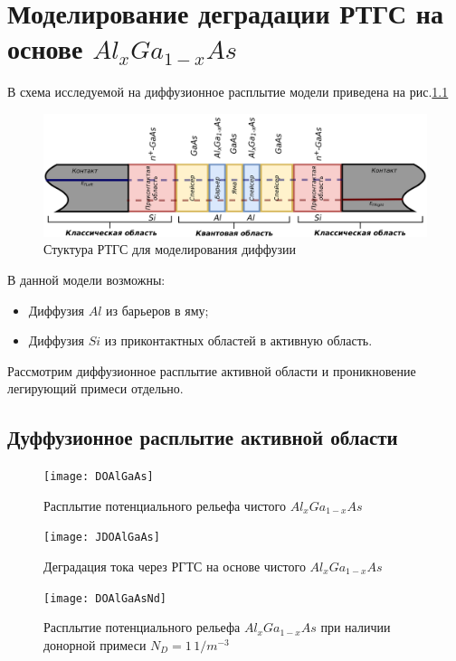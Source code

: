 \chapter{Моделирование деградации РТГС на основе $Al_{x}Ga_{1−x}As$}
В схема исследуемой на диффузионное расплытие модели приведена на рис.\ref{fig:RTHSModelDiff}

\begin{figure}
	\centering
	\includegraphics[width=0.9\linewidth]{assets/RTHSModelDiff}
	\caption{Стуктура РТГС для моделирования диффузии}
	\label{fig:RTHSModelDiff}
\end{figure}

В данной модели возможны:
\begin{itemize}
	\item Диффузия $Al$ из барьеров в яму;\\
	\item Диффузия $Si$ из приконтактных областей в активную область.
\end{itemize}

Рассмотрим диффузионное расплытие активной области и проникновение легирующий примеси отдельно.

\section{Дуффузионное расплытие активной области}
\begin{figure}[h]
	\centering
	\texttt{[image: DOAlGaAs]}
	\caption{Расплытие потенциального рельефа чистого $Al_{x}Ga_{1−x}As$}
	\label{fig:DOAlGaAs}
\end{figure}

\begin{figure}[h]
	\centering
	\texttt{[image: JDOAlGaAs]}
	\caption{Деградация тока через РГТС на основе чистого $Al_{x}Ga_{1−x}As$}
	\label{fig:JDOAlGaAs}
\end{figure}

\begin{figure}[h]
	\centering
	\texttt{[image: DOAlGaAsNd]}
	\caption{Расплытие потенциального рельефа $Al_{x}Ga_{1−x}As$ при наличии донорной примеси $N_{D}=1\,1/m^{-3}$} 
	\label{fig:DOAlGaAsNd}
\end{figure}


